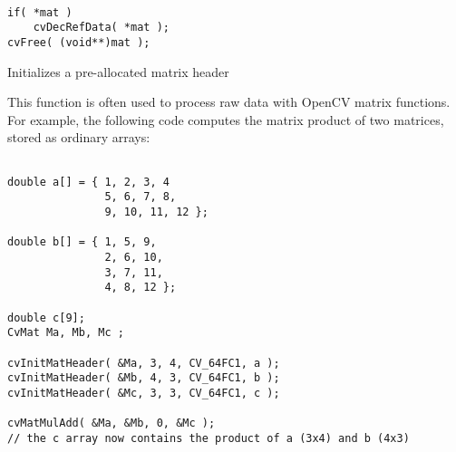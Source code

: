 \begin{lstlisting}

if( *mat )
    cvDecRefData( *mat );
cvFree( (void**)mat );

\end{lstlisting}


\label{InitMatHeader}

Initializes a pre-allocated matrix header


\begin{description}
\end{description}

This function is often used to process raw data with OpenCV matrix functions. For example, the following code computes the matrix product of two matrices, stored as ordinary arrays:

\begin{lstlisting}

double a[] = { 1, 2, 3, 4
               5, 6, 7, 8,
               9, 10, 11, 12 };

double b[] = { 1, 5, 9,
               2, 6, 10,
               3, 7, 11,
               4, 8, 12 };

double c[9];
CvMat Ma, Mb, Mc ;

cvInitMatHeader( &Ma, 3, 4, CV_64FC1, a );
cvInitMatHeader( &Mb, 4, 3, CV_64FC1, b );
cvInitMatHeader( &Mc, 3, 3, CV_64FC1, c );

cvMatMulAdd( &Ma, &Mb, 0, &Mc );
// the c array now contains the product of a (3x4) and b (4x3)

\end{lstlisting}

